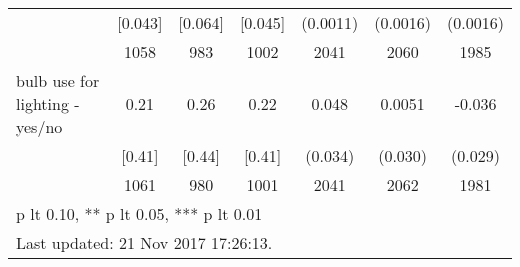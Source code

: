 \begin{table}[htbp]
\begin{tabular*}{1\hsize}{@{\hskip\tabcolsep\extracolsep\fill}l*{1}{cccccc}}
                                &  [0.043]&  [0.064]&  [0.045]& (0.0011)         & (0.0016)         & (0.0016)         \\
                                &     1058&      983&     1002&     2041         &     2060         &     1985         \\
bulb use for lighting  - yes/no &     0.21&     0.26&     0.22&    0.048         &   0.0051         &   -0.036         \\
                                &   [0.41]&   [0.44]&   [0.41]&  (0.034)         &  (0.030)         &  (0.029)         \\
                                &     1061&      980&     1001&     2041         &     2062         &     1981         \\
\bottomrule
\multicolumn{7}{l}{\footnotesize * p lt 0.10, ** p lt 0.05, *** p lt 0.01}\\
\multicolumn{7}{l}{\footnotesize Last updated: 21 Nov 2017 17:26:13.}\\
\end{tabular*}
\end{table}
